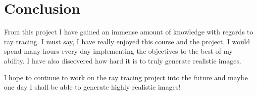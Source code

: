 \chapter{Conclusion}

From this project I have gained an immense amount of knowledge with regards to ray tracing.
I must say, I have really enjoyed this course and the project. I would spend many hours every day implementing
the objectives to the best of my ability. I have also discovered how hard it is to truly generate realistic
images.

I hope to continue to work on the ray tracing project into the future and maybe one day I shall be able to 
generate highly realistic images!

